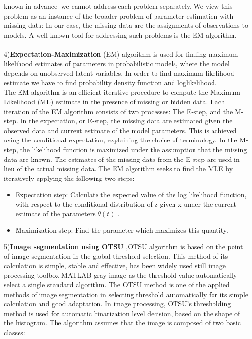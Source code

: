 \documentclass{article}
\begin{document}
known in advance, we cannot address each problem
separately. We view this problem as an instance of the
broader problem of parameter estimation with missing
data: In our case, the missing data are the assignments of
observations to models. A well-known tool for addressing
such problems is the EM algorithm.\\\\
4)\textbf{Expectation-Maximization} (EM) algorithm
is used for finding maximum likelihood estimates of
parameters in probabilistic models, where the model
depends on unobserved latent variables. In order to find
maximum likelihood estimate we have to find probability
density function and loglikelihood. \\
The EM algorithm is an efficient iterative
procedure to compute the Maximum Likelihood (ML)
estimate in the presence of missing or hidden data. Each
iteration of the EM algorithm consists of two processes:
The E-step, and the M-step. In the expectation, or E-step,
the missing data are estimated given the observed data and
current estimate of the model parameters. This is achieved
using the conditional expectation, explaining the choice of
terminology. In the M-step, the likelihood function is
maximized under the assumption that the missing data are
known. The estimates of the missing data from the E-step
are used in lieu of the actual missing data.
The EM algorithm seeks to find the MLE by
iteratively applying the following two steps:
\begin{itemize}
\item Expectation step: Calculate the expected value of
the log likelihood function, with respect to the conditional
distribution of z given x under the current estimate of the
parameters $\theta (t)$ .
\item Maximization step: Find the parameter which
maximizes this quantity. 
\end{itemize}
5)\textbf{Image segmentation using OTSU}
,OTSU algorithm is based on the point of image
segmentation in the global threshold selection. This
method of its calculation is simple, stable and effective,
has been widely used still image processing toolbox
MATLAB gray image as the threshold value
automatically select a single standard algorithm. The
OTSU method is one of the applied methods of image
segmentation in selecting threshold automatically for its
simple calculation and good adaptation.
In image processing, OTSU’s thresholding
method is used for automatic binarization level decision,
based on the shape of the histogram. The algorithm
assumes that the image is composed of two basic classes:
\end{document}
